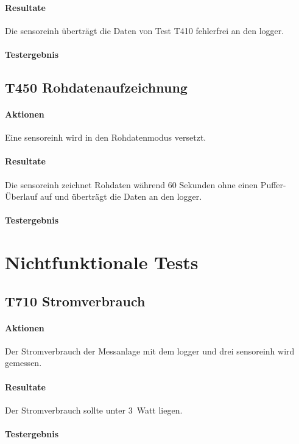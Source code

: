\paragraph{Resultate} Die \gls{sensoreinh} überträgt die Daten von Test T410 fehlerfrei an den \gls{logger}.

\paragraph{Testergebnis} 

\subsection{T450 Rohdatenaufzeichnung}
\paragraph{Aktionen} Eine \gls{sensoreinh} wird in den Rohdatenmodus versetzt.

\paragraph{Resultate} Die \gls{sensoreinh} zeichnet Rohdaten während 60 Sekunden ohne einen Puffer-Überlauf auf und überträgt die Daten an den \gls{logger}.

\paragraph{Testergebnis} 

\section{Nichtfunktionale Tests}
\subsection{T710 Stromverbrauch}
\paragraph{Aktionen} Der Stromverbrauch der Messanlage mit dem \gls{logger} und drei \gls{sensoreinh} wird gemessen. 

\paragraph{Resultate} Der Stromverbrauch sollte unter 3~Watt liegen.

\paragraph{Testergebnis} 
